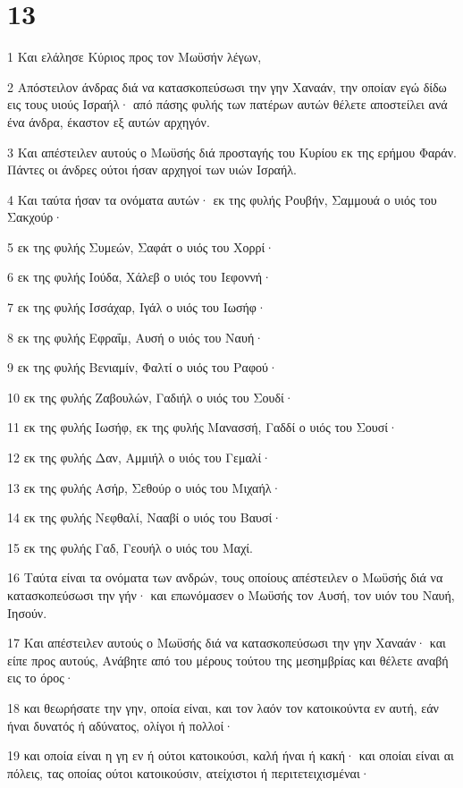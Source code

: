 \chapter{13}

\par 1 Και ελάλησε Κύριος προς τον Μωϋσήν λέγων,
\par 2 Απόστειλον άνδρας διά να κατασκοπεύσωσι την γην Χαναάν, την οποίαν εγώ δίδω εις τους υιούς Ισραήλ· από πάσης φυλής των πατέρων αυτών θέλετε αποστείλει ανά ένα άνδρα, έκαστον εξ αυτών αρχηγόν.
\par 3 Και απέστειλεν αυτούς ο Μωϋσής διά προσταγής του Κυρίου εκ της ερήμου Φαράν. Πάντες οι άνδρες ούτοι ήσαν αρχηγοί των υιών Ισραήλ.
\par 4 Και ταύτα ήσαν τα ονόματα αυτών· εκ της φυλής Ρουβήν, Σαμμουά ο υιός του Σακχούρ·
\par 5 εκ της φυλής Συμεών, Σαφάτ ο υιός του Χορρί·
\par 6 εκ της φυλής Ιούδα, Χάλεβ ο υιός του Ιεφοννή·
\par 7 εκ της φυλής Ισσάχαρ, Ιγάλ ο υιός του Ιωσήφ·
\par 8 εκ της φυλής Εφραΐμ, Αυσή ο υιός του Ναυή·
\par 9 εκ της φυλής Βενιαμίν, Φαλτί ο υιός του Ραφού·
\par 10 εκ της φυλής Ζαβουλών, Γαδιήλ ο υιός του Σουδί·
\par 11 εκ της φυλής Ιωσήφ, εκ της φυλής Μανασσή, Γαδδί ο υιός του Σουσί·
\par 12 εκ της φυλής Δαν, Αμμιήλ ο υιός του Γεμαλί·
\par 13 εκ της φυλής Ασήρ, Σεθούρ ο υιός του Μιχαήλ·
\par 14 εκ της φυλής Νεφθαλί, Νααβί ο υιός του Βαυσί·
\par 15 εκ της φυλής Γαδ, Γεουήλ ο υιός του Μαχί.
\par 16 Ταύτα είναι τα ονόματα των ανδρών, τους οποίους απέστειλεν ο Μωϋσής διά να κατασκοπεύσωσι την γήν· και επωνόμασεν ο Μωϋσής τον Αυσή, τον υιόν του Ναυή, Ιησούν.
\par 17 Και απέστειλεν αυτούς ο Μωϋσής διά να κατασκοπεύσωσι την γην Χαναάν· και είπε προς αυτούς, Ανάβητε από του μέρους τούτου της μεσημβρίας και θέλετε αναβή εις το όρος·
\par 18 και θεωρήσατε την γην, οποία είναι, και τον λαόν τον κατοικούντα εν αυτή, εάν ήναι δυνατός ή αδύνατος, ολίγοι ή πολλοί·
\par 19 και οποία είναι η γη εν ή ούτοι κατοικούσι, καλή ήναι ή κακή· και οποίαι είναι αι πόλεις, τας οποίας ούτοι κατοικούσιν, ατείχιστοι ή περιτετειχισμέναι·
